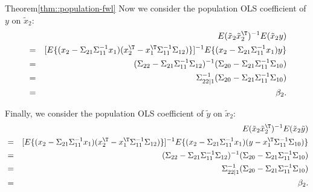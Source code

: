 \begin{myproof}{Theorem}{\ref{thm::population-fwl}}
Now we consider the population OLS coefficient of $y$ on $\tilde{x}_2$:
\begin{eqnarray*}
&& E(\tilde{x}_2\tilde{x}_2^{\T})^{-1} E(\tilde{x}_2 y) \\ 
&=& [ E \{  (x_2 - \Sigma_{21} \Sigma_{11}^{-1} x_1) (x_2^{\T} - x_1 ^{\T} \Sigma_{11}^{-1} \Sigma_{12} ) \} ]^{-1}
E\{  (x_2 - \Sigma_{21} \Sigma_{11}^{-1} x_1)  y  \} \\
&=& (\Sigma_{22} -\Sigma_{21} \Sigma_{11}^{-1} \Sigma_{12} )^{-1} (\Sigma_{20} -\Sigma_{21} \Sigma_{11}^{-1} \Sigma_{10} ) \\
&=& \Sigma_{22\mid 1}^{-1}  (\Sigma_{20} -\Sigma_{21} \Sigma_{11}^{-1} \Sigma_{10} )\\
&=& \beta_2.
\end{eqnarray*}

Finally, we consider the population OLS coefficient of $\tilde{y}$ on $\tilde{x}_2$:
\begin{eqnarray*}
&& E(\tilde{x}_2\tilde{x}_2^{\T})^{-1} E(\tilde{x}_2 \tilde{y}) \\
&=& [ E \{  (x_2 - \Sigma_{21} \Sigma_{11}^{-1} x_1) (x_2^{\T} - x_1 ^{\T} \Sigma_{11}^{-1} \Sigma_{12} ) \} ]^{-1}
E\{  (x_2 - \Sigma_{21} \Sigma_{11}^{-1} x_1) (y - x_1 ^{\T} \Sigma_{11}^{-1} \Sigma_{10} ) \} \\
&=& (\Sigma_{22} -\Sigma_{21} \Sigma_{11}^{-1} \Sigma_{12} )^{-1} (\Sigma_{20} -\Sigma_{21} \Sigma_{11}^{-1} \Sigma_{10} ) \\
&=& \Sigma_{22\mid 1}^{-1}  (\Sigma_{20} -\Sigma_{21} \Sigma_{11}^{-1} \Sigma_{10} )\\
&=& \beta_2.
\end{eqnarray*}

\end{myproof}


